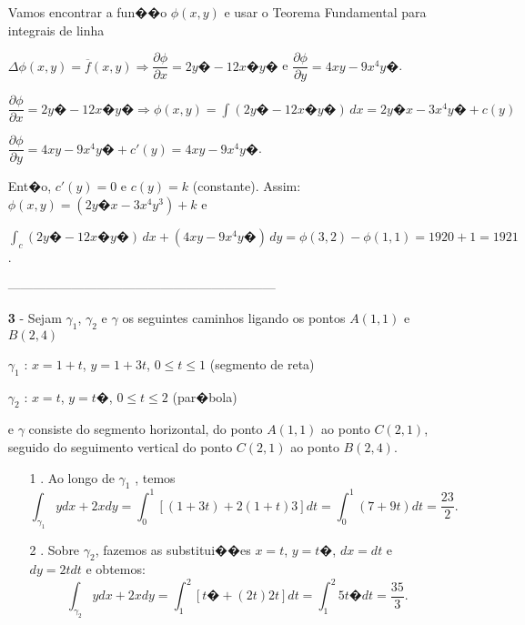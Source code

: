 \documentclass[12pt]{article}
\begin{document}
\begin{enumerate}
          Vamos encontrar a fun��o $\phi(x,y)$ e usar o Teorema Fundamental para integrais de linha

          \doublespacing
          $\Delta \phi(x,y)=\overline{f}(x,y) \Rightarrow \dfrac{\partial \phi}{\partial x} = 2y�-12x�y�$  e  $\dfrac{\partial \phi}{\partial y} = 4xy - 9x^4y�$.


          $\dfrac{\partial \phi}{\partial x} = 2y� - 12x�y� \Rightarrow \phi(x,y) = \int (2y�-12x�y�)\,dx
              = 2y�x - 3x^4y� + c(y)$

          $\dfrac{\partial \phi}{\partial y} = 4xy - 9x^4y� + c'(y) = 4xy - 9x^4y�$.

          Ent�o, $c'(y)=0$ e $c(y)=k$ (constante). Assim: $\phi(x,y)=(2y�x-3x^4y^3) + k $ e

          $\int_c (2y�-12x�y�)\,dx + (4xy - 9x^4y�)\,dy = \phi(3,2) - \phi(1,1) = 1920 + 1 = 1921$.

          \singlespacing
          \begin{center}
              ---------------------------------------------------------------
          \end{center}
    \item[\textbf{3}]- Sejam $\gamma_1$, $\gamma_2$ e $\gamma$ os seguintes caminhos ligando os pontos $A(1,1)$ e $B(2,4)$


          \begin{center}
              $\gamma_1$ : $x = 1 + t$, $y=1+ 3t$, $0\leqslant t \leqslant 1$ (segmento de reta)

              $\gamma_2$ : $x=t$, $y=t�$, $0\leqslant t \leqslant 2$ (par�bola)
          \end{center}

          e $\gamma$ consiste do segmento horizontal, do ponto $A(1,1)$ ao ponto $C(2,1)$, seguido do seguimento vertical do ponto $C(2,1)$ ao ponto $B(2,4)$.

          \begin{enumerate}
              \item[1]. Ao longo de $\gamma_1$ , temos
                    $$\int_{\gamma_1} ydx + 2xdy = \int_{0}^{1} [(1+3t) + 2(1+t)3]dt = \int_{0}^{1}(7+9t)dt = \dfrac{23}{2}. $$

              \item[2]. Sobre $\gamma_2$, fazemos as substitui��es $x=t$, $y=t�$, $dx=dt$ e $dy=2tdt$ e obtemos:
                    $$\int_{\gamma_2} ydx + 2xdy = \int_1^2 [t�+(2t)2t]dt = \int_1^2 5t�dt = \dfrac{35}{3}.$$


\end{enumerate}
\end{enumerate}
\end{document}
